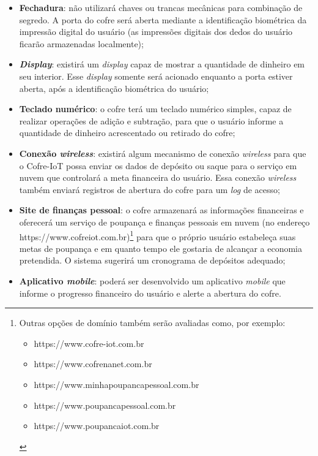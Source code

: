 \documentclass[pdftex, brazil, 12pt, twoside]{article}
\newcommand{\ingles}[1]{\textit{#1}}
\begin{document}
\begin{itemize}
\item \textbf{Fechadura}: não utilizará chaves ou trancas mecânicas para
  combinação de segredo. A porta do cofre será aberta mediante a identificação
  biométrica da impressão digital do usuário (as impressões digitais
  dos dedos do usuário ficarão armazenadas localmente);
\item \textbf{\ingles{Display}}: existirá um \ingles{display} capaz de mostrar
  a quantidade de dinheiro em seu interior. Esse \ingles{display} somente será
  acionado enquanto a porta estiver aberta, após a identificação biométrica do usuário;
\item \textbf{Teclado numérico}: o cofre terá um teclado numérico simples,
  capaz de realizar operações de adição e subtração, para que o usuário informe
  a quantidade de dinheiro acrescentado ou retirado do cofre;
\item \textbf{Conexão \ingles{wireless}}: existirá algum mecanismo de conexão
  \ingles{wireless} para que o Cofre-IoT possa enviar os dados de depósito ou
  saque para o serviço em nuvem que controlará a meta financeira do usuário.
  Essa conexão \ingles{wireless} também enviará registros de abertura do cofre
  para um \ingles{log} de acesso;
\item \textbf{Site de finanças pessoal}: o cofre armazenará as informações
  financeiras e oferecerá um serviço de poupança e finanças pessoais em nuvem
  (no endereço https://www.cofreiot.com.br)\footnote{%
    Outras opções de domínio também serão avaliadas como, por exemplo:
    \begin{itemize}[noitemsep]
    \item https://www.cofre-iot.com.br
    \item https://www.cofrenanet.com.br
    \item https://www.minhapoupancapessoal.com.br
    \item https://www.poupancapessoal.com.br
    \item https://www.poupancaiot.com.br
    \end{itemize}}
  para que o próprio usuário estabeleça suas metas de poupança e em quanto
  tempo ele gostaria de alcançar a economia pretendida. O sistema sugerirá
  um cronograma de depósitos adequado;
\item \textbf{Aplicativo \ingles{mobile}}: poderá ser desenvolvido um
  aplicativo \ingles{mobile} que informe o progresso financeiro do
  usuário e alerte a abertura do cofre.
\end{itemize}
\end{document}
